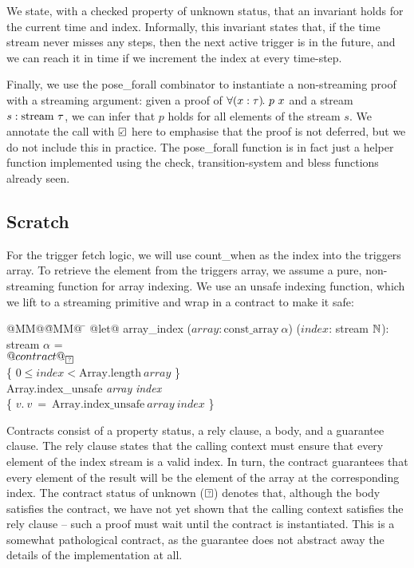 We state, with a checked property of unknown status, that an invariant holds for the current time and index.
Informally, this invariant states that, if the time stream never misses any steps, then the next active trigger is in the future, and we can reach it in time if we increment the index at every time-step.

Finally, we use the pose_forall combinator to instantiate a non-streaming proof with a streaming argument: given a proof of $\forall (x: \tau)\hspace{-0.1em}.~p~x$ and a stream $s: \text{stream}~{\tau}$, we can infer that $p$ holds for all elements of the stream $s$.
We annotate the call with $\PSValid$ here to emphasise that the proof is not deferred, but we do not include this in practice.
The pose_forall function is in fact just a helper function implemented using the check, transition-system and bless functions already seen.

\subsection{Scratch}

For the trigger fetch logic, we will use count_when as the index into the triggers array.
To retrieve the element from the triggers array, we assume a pure, non-streaming \fstar{} function for array indexing.
We use an unsafe indexing function, which we lift to a streaming primitive and wrap in a contract to make it safe:

\begin{tabbing}
  @MM@\= @MM@ \= \kill
  @let@ array_index ($\textit{array}: \mbox{const_array}~\alpha$) ($\textit{index}$: stream $\mathbb{N}$): stream $\alpha$ = \\
  \> $@contract@_{\PSUnknown}$ \\
  \> \> \{ $0 \le \textit{index} < \mbox{Array.length}~\textit{array}$ \} \\
  \> \> Array.index_unsafe \textit{array} \textit{index} \\
  \> \> \{ $v.~v~=~\mbox{Array.index_unsafe}~\textit{array}~\textit{index}$ \} \\
\end{tabbing}

Contracts consist of a property status, a rely clause, a body, and a guarantee clause.
The rely clause states that the calling context must ensure that every element of the index stream is a valid index.
In turn, the contract guarantees that every element of the result will be the element of the array at the corresponding index.
The contract status of unknown ($\PSUnknown$) denotes that, although the body satisfies the contract, we have not yet shown that the calling context satisfies the rely clause -- such a proof must wait until the contract is instantiated.
This is a somewhat pathological contract, as the guarantee does not abstract away the details of the implementation at all.

